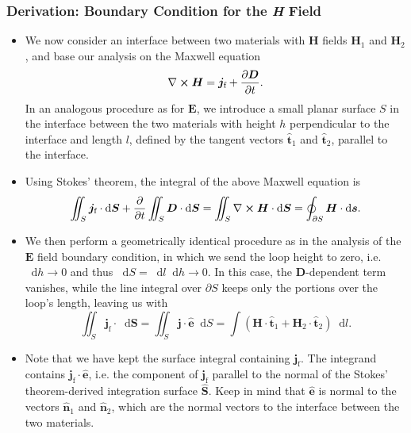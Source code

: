 \documentclass[11pt, a4paper]{article}
\newcommand{\diff}{\mathop{}\!\mathrm{d}} %
\renewcommand{\vec}[1]{\bm{#1}} %
\newcommand{\uvec}[1]{\hat{\vec{#1}}} %
\newcommand{\E}{\vec{E}} %
\newcommand{\D}{\vec{D}}  %
\renewcommand{\H}{\vec{H}}  %
\renewcommand{\j}{\vec{j}}  %
\renewcommand{\curl}{\nabla \cross}
\begin{document}
\subsubsection{Derivation: Boundary Condition for the \textit{H} Field}
\begin{itemize}
	\item We now consider an interface between two materials with $ \H $ fields $ \H_{1} $ and $ \H_{2} $, and base our analysis on the Maxwell equation
	\begin{equation*}
		\curl \H = \j_{\text{f}} + \pdv{\D}{t}.
	\end{equation*}
	In an analogous procedure as for $ \E $, we introduce a small planar surface $ S $ in the interface between the two materials with height $ h $ perpendicular to the interface and length $ l $, defined by the tangent vectors $ \uvec{t}_{1} $ and $ \uvec{t}_{2} $, parallel to the interface.
	
	\item Using Stokes' theorem, the integral of the above Maxwell equation is
    \begin{equation*}
        \iint_{S} \j_{\text{f}} \cdot \diff \vec{S} + \pdv{t} \iint_{S} \D \cdot \diff \vec{S} = \iint_{S} \curl \H \cdot \diff \vec{S} = \oint_{\partial S} \H \cdot \diff \vec{s}.
	\end{equation*}

    \item We then perform a geometrically identical procedure as in the analysis of the $ \E $ field boundary condition, in which we send the loop height to zero, i.e. $ \diff h \to 0 $ and thus $ \diff S = \diff l \diff h \to 0 $. In this case, the $ \D $-dependent term vanishes, while the line integral over $ \partial S $ keeps only the portions over the loop's length, leaving us with
	\begin{equation*}
        \iint_{S} \j_{\text{f}} \cdot \diff \vec{S} = \iint_{S} \j \cdot \uvec{e} \diff S = \int (\H \cdot \uvec{t}_{1} + \H_{2}\cdot \uvec{t}_{2}) \diff l.
	\end{equation*}
    
    \item Note that we have kept the surface integral containing $ \j_{\text{f}} $. The integrand contains $ \j_{\text{f}} \cdot \uvec{e} $, i.e. the component of $ \j_{\text{f}} $ parallel to the normal of the Stokes' theorem-derived integration surface $ \uvec{S} $. Keep in mind that $ \uvec{e} $ is normal to the vectors $ \uvec{n}_{1} $ and $ \uvec{n}_{2} $, which are the normal vectors to the interface between the two materials.


\end{itemize}
\end{document}
